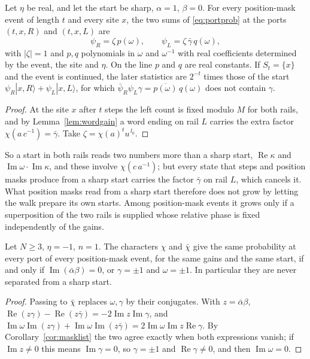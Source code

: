 \begin{proposition}\label{prop:maskprep}
Let $\eta$ be real, and let the start be sharp, $\alpha=1$, $\beta=0$. For every position-mask event of length $t$ and every site $x$, the two sums of \eqref{eq:portprob} at the ports $(t,x,R)$ and $(t,x,L)$ are
\[
\psi_R=\zeta\,p(\omega),\qquad\psi_L=\zeta\,\bar\gamma\,q(\omega),
\]
with $|\zeta|=1$ and $p,q$ polynomials in $\omega$ and $\omega^{-1}$ with real coefficients determined by the event, the site and $\eta$. On the line $p$ and $q$ are real constants. If $S_{t}=\{x\}$ and the event is continued, the later statistics are $2^{-t}$ times those of the start $\psi_R|x,R\rangle+\psi_L|x,L\rangle$, for which $\bar\psi_R\psi_L\gamma=\overline{p(\omega)}\,q(\omega)$ does not contain $\gamma$.
\end{proposition}
\begin{proof}
At the site $x$ after $t$ steps the left count is fixed modulo $M$ for both rails, and by Lemma~\ref{lem:wordgain} a word ending on rail $L$ carries the extra factor $\chi(a\,c^{-1})=\bar\gamma$. Take $\zeta=\chi(a)^{t}u^{\,l_0}$.
\end{proof}

So a start in both rails reads two numbers more than a sharp start, $\operatorname{Re}\kappa$ and $\operatorname{Im}\omega\cdot\operatorname{Im}\kappa$, and these involve $\chi(c\,a^{-1})$; but every state that steps and position masks produce from a sharp start carries the factor $\bar\gamma$ on rail $L$, which cancels it. What position masks read from a sharp start therefore does not grow by letting the walk prepare its own starts. Among position-mask events it grows only if a superposition of the two rails is supplied whose relative phase is fixed independently of the gains.

\begin{corollary}\label{cor:maskconj}
Let $N\ge3$, $\eta=-1$, $n=1$. The characters $\chi$ and $\bar\chi$ give the same probability at every port of every position-mask event, for the same gains and the same start, if and only if $\operatorname{Im}(\bar\alpha\beta)=0$, or $\gamma=\pm1$ and $\omega=\pm1$. In particular they are never separated from a sharp start.
\end{corollary}
\begin{proof}
Passing to $\bar\chi$ replaces $\omega,\gamma$ by their conjugates. With $z=\bar\alpha\beta$, $\operatorname{Re}(z\gamma)-\operatorname{Re}(z\bar\gamma)=-2\operatorname{Im}z\operatorname{Im}\gamma$, and $\operatorname{Im}\omega\operatorname{Im}(z\gamma)+\operatorname{Im}\omega\operatorname{Im}(z\bar\gamma)=2\operatorname{Im}\omega\operatorname{Im}z\operatorname{Re}\gamma$. By Corollary~\ref{cor:masklist} the two agree exactly when both expressions vanish; if $\operatorname{Im}z\ne0$ this means $\operatorname{Im}\gamma=0$, so $\gamma=\pm1$ and $\operatorname{Re}\gamma\ne0$, and then $\operatorname{Im}\omega=0$.
\end{proof}

